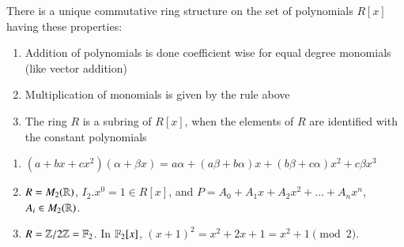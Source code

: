 \documentclass[12pt, a4paper, oneside, openright, titlepage]{book}
\begin{document}
\begin{prop}
    There is a unique commutative ring structure on the set of polynomials $R[x]$ having these properties:\begin{enumerate}
        \item Addition of polynomials is done coefficient wise for equal degree monomials (like vector addition)
        \item Multiplication of monomials is given by the rule above
        \item The ring $R$ is a subring of $R[x]$, when the elements of $R$ are identified with the constant polynomials
    \end{enumerate}
\end{prop}

\begin{rmk}
    \leavevmode
    \begin{enumerate}
        \item $(a+bx+cx^2)(\alpha+\beta x) = a\alpha + (a\beta + b\alpha)x + (b\beta + c\alpha)x^2 + c\beta x^3$
        \item $R = M_2(\mathbb R)$, $I_2.x^0 = 1 \in R[x]$, and $P = A_0 + A_1x + A_2x^2 + ... + A_nx^n$, $A_i \in M_2(\mathbb R)$.
        \item $R = \mathbb Z/2\mathbb Z = \mathbb F_2$. In $\mathbb F_2[x]$, $(x+1)^2 = x^2+2x+1 = x^2+1 \pmod{2}$.
    \end{enumerate}
\end{rmk}
\end{document}

